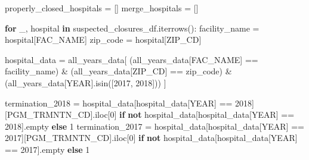 \documentclass[
  letterpaper,
  DIV=11,
  numbers=noendperiod]{scrartcl}
\newenvironment{Shaded}{\begin{snugshade}}{\end{snugshade}}
\newcommand{\ControlFlowTok}[1]{\textcolor[rgb]{0.00,0.23,0.31}{\textbf{#1}}}
\newcommand{\DecValTok}[1]{\textcolor[rgb]{0.68,0.00,0.00}{#1}}
\newcommand{\KeywordTok}[1]{\textcolor[rgb]{0.00,0.23,0.31}{\textbf{#1}}}
\newcommand{\NormalTok}[1]{\textcolor[rgb]{0.00,0.23,0.31}{#1}}
\newcommand{\OperatorTok}[1]{\textcolor[rgb]{0.37,0.37,0.37}{#1}}
\newcommand{\StringTok}[1]{\textcolor[rgb]{0.13,0.47,0.30}{#1}}
\begin{document}
\begin{Shaded}
\begin{Highlighting}[]
\NormalTok{properly\_closed\_hospitals }\OperatorTok{=}\NormalTok{ []}
\NormalTok{merge\_hospitals }\OperatorTok{=}\NormalTok{ []}

\ControlFlowTok{for}\NormalTok{ \_, hospital }\KeywordTok{in}\NormalTok{ suspected\_closures\_df.iterrows():}
\NormalTok{    facility\_name }\OperatorTok{=}\NormalTok{ hospital[}\StringTok{\textquotesingle{}FAC\_NAME\textquotesingle{}}\NormalTok{]}
\NormalTok{    zip\_code }\OperatorTok{=}\NormalTok{ hospital[}\StringTok{\textquotesingle{}ZIP\_CD\textquotesingle{}}\NormalTok{]}
    
\NormalTok{    hospital\_data }\OperatorTok{=}\NormalTok{ all\_years\_data[}
\NormalTok{        (all\_years\_data[}\StringTok{\textquotesingle{}FAC\_NAME\textquotesingle{}}\NormalTok{] }\OperatorTok{==}\NormalTok{ facility\_name) }\OperatorTok{\&} 
\NormalTok{        (all\_years\_data[}\StringTok{\textquotesingle{}ZIP\_CD\textquotesingle{}}\NormalTok{] }\OperatorTok{==}\NormalTok{ zip\_code) }\OperatorTok{\&}
\NormalTok{        (all\_years\_data[}\StringTok{\textquotesingle{}YEAR\textquotesingle{}}\NormalTok{].isin([}\DecValTok{2017}\NormalTok{, }\DecValTok{2018}\NormalTok{]))}
\NormalTok{    ]}

\NormalTok{    termination\_2018 }\OperatorTok{=}\NormalTok{ hospital\_data[hospital\_data[}\StringTok{\textquotesingle{}YEAR\textquotesingle{}}\NormalTok{] }\OperatorTok{==} \DecValTok{2018}\NormalTok{][}\StringTok{\textquotesingle{}PGM\_TRMNTN\_CD\textquotesingle{}}\NormalTok{].iloc[}\DecValTok{0}\NormalTok{] }\ControlFlowTok{if} \KeywordTok{not}\NormalTok{ hospital\_data[hospital\_data[}\StringTok{\textquotesingle{}YEAR\textquotesingle{}}\NormalTok{] }\OperatorTok{==} \DecValTok{2018}\NormalTok{].empty }\ControlFlowTok{else} \StringTok{\textquotesingle{}1\textquotesingle{}}
\NormalTok{    termination\_2017 }\OperatorTok{=}\NormalTok{ hospital\_data[hospital\_data[}\StringTok{\textquotesingle{}YEAR\textquotesingle{}}\NormalTok{] }\OperatorTok{==} \DecValTok{2017}\NormalTok{][}\StringTok{\textquotesingle{}PGM\_TRMNTN\_CD\textquotesingle{}}\NormalTok{].iloc[}\DecValTok{0}\NormalTok{] }\ControlFlowTok{if} \KeywordTok{not}\NormalTok{ hospital\_data[hospital\_data[}\StringTok{\textquotesingle{}YEAR\textquotesingle{}}\NormalTok{] }\OperatorTok{==} \DecValTok{2017}\NormalTok{].empty }\ControlFlowTok{else} \StringTok{\textquotesingle{}1\textquotesingle{}}


\end{Highlighting}
\end{Shaded}
\end{document}
